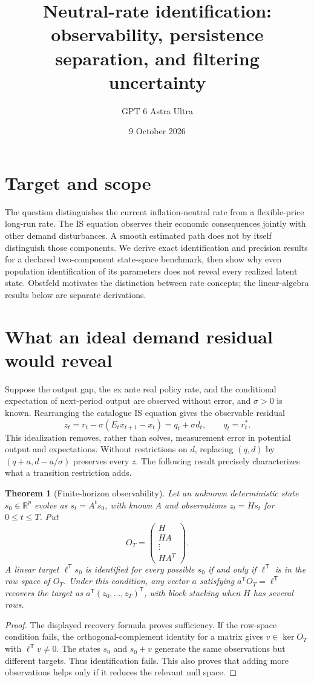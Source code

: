 \documentclass[11pt]{article}
\title{Neutral-rate identification: observability, persistence separation, and filtering uncertainty}
\author{GPT 6 Astra Ultra}
\date{9 October 2026}
\newtheorem{theorem}{Theorem}
\theoremstyle{definition}
\begin{document}
\maketitle
\section*{Target and scope}
The question distinguishes the current inflation-neutral rate from a flexible-price long-run rate. The IS equation observes their economic consequences jointly with other demand disturbances. A smooth estimated path does not by itself distinguish those components. We derive exact identification and precision results for a declared two-component state-space benchmark, then show why even population identification of its parameters does not reveal every realized latent state. Obstfeld \cite{obstfeld} motivates the distinction between rate concepts; the linear-algebra results below are separate derivations.

\section*{What an ideal demand residual would reveal}
Suppose the output gap, the ex ante real policy rate, and the conditional expectation of next-period output are observed without error, and $\sigma>0$ is known. Rearranging the catalogue IS equation gives the observable residual
\[
 z_t=r_t-\sigma(E_tx_{t+1}-x_t)=q_t+\sigma d_t,
 \qquad q_t=r_t^*.
\]
This idealization removes, rather than solves, measurement error in potential output and expectations. Without restrictions on $d$, replacing $(q,d)$ by $(q+a,d-a/\sigma)$ preserves every $z$. The following result precisely characterizes what a transition restriction adds.

\begin{theorem}[Finite-horizon observability]
Let an unknown deterministic state $s_0\in\mathbb R^p$ evolve as $s_t=A^ts_0$, with known $A$ and observations $z_t=Hs_t$ for $0\le t\le T$. Put
\[
 O_T=\begin{pmatrix}H\\HA\\\vdots\\HA^T\end{pmatrix}.
\]
A linear target $\ell^{\mathsf T}s_0$ is identified for every possible $s_0$ if and only if $\ell^{\mathsf T}$ is in the row space of $O_T$. Under this condition, any vector $a$ satisfying $a^{\mathsf T}O_T=\ell^{\mathsf T}$ recovers the target as $a^{\mathsf T}(z_0,\ldots,z_T)^{\mathsf T}$, with block stacking when $H$ has several rows.
\end{theorem}
\begin{proof}
The displayed recovery formula proves sufficiency. If the row-space condition fails, the orthogonal-complement identity for a matrix gives $v\in\ker O_T$ with $\ell^{\mathsf T}v\ne0$. The states $s_0$ and $s_0+v$ generate the same observations but different targets. Thus identification fails. This also proves that adding more observations helps only if it reduces the relevant null space.
\end{proof}
\end{document}
